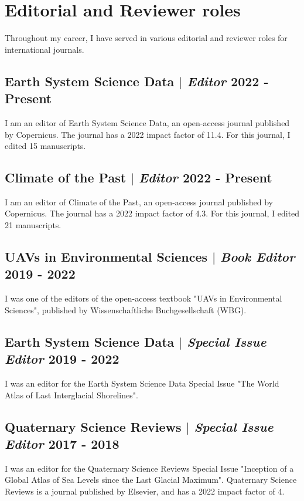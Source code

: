 \documentclass[11pt]{article}
\begin{document}
\section{Editorial and Reviewer roles}
{\normalfont Throughout my career, I have served in various editorial and reviewer roles for international journals.}\\

\bigskip

\subsection{Earth System Science Data  $|$ {\normalfont\textit{Editor}} \hfill 2022 - Present}
{\footnotesize I am an editor of Earth System Science Data, an open-access journal published by Copernicus. The journal has a 2022 impact factor of 11.4. For this journal, I edited 15 manuscripts.}
\bigskip

\subsection{Climate of the Past  $|$ {\normalfont\textit{Editor}} \hfill 2022 - Present}
{\footnotesize I am an editor of Climate of the Past, an open-access journal published by Copernicus. The journal has a 2022 impact factor of 4.3. For this journal, I edited 21 manuscripts.}
\bigskip

\subsection{UAVs in Environmental Sciences  $|$ {\normalfont\textit{Book Editor}} \hfill 2019 - 2022}
{\footnotesize I was one of the editors of the open-access textbook "UAVs in Environmental Sciences", published by Wissenschaftliche Buchgesellschaft (WBG).}
\bigskip

\subsection{Earth System Science Data  $|$ {\normalfont\textit{Special Issue Editor}} \hfill 2019 - 2022}
{\footnotesize I was an editor for the Earth System Science Data Special Issue "The World Atlas of Last Interglacial Shorelines".}
\bigskip

\subsection{Quaternary Science Reviews  $|$ {\normalfont\textit{Special Issue Editor}} \hfill 2017 - 2018}
{\footnotesize I was an editor for the Quaternary Science Reviews Special Issue "Inception of a Global Atlas of Sea Levels since the Last Glacial Maximum". Quaternary Science Reviews is a journal published by Elsevier, and has a 2022 impact factor of 4.}
\bigskip
\end{document}
